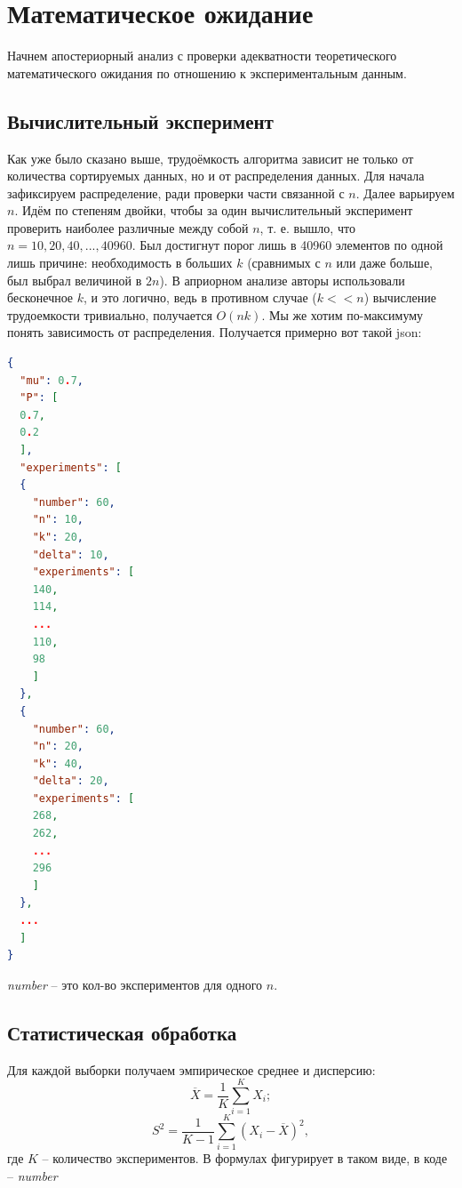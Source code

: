 \documentclass[a4paper, 12pt]{article}
\begin{document}
\newpage
\section{Математическое ожидание}
Начнем апостериорный анализ с проверки адекватности теоретического математического ожидания по отношению к экспериментальным данным.
\subsection{Вычислительный эксперимент}
Как уже было сказано выше, трудоёмкость алгоритма зависит не только от количества сортируемых данных, но и от распределения данных. Для начала зафиксируем распределение, ради проверки части связанной с $n$. Далее варьируем $n$. Идём по степеням двойки, чтобы за один вычислительный эксперимент проверить наиболее различные между собой $n$, т. е. вышло, что $n = 10, 20, 40, ..., 40960$. Был достигнут порог лишь в 40960 элементов по одной лишь причине: необходимость в больших $k$ (сравнимых с $n$ или даже больше, был выбрал величиной в $2n$). В априорном анализе авторы использовали бесконечное $k$, и это логично, ведь в противном случае ($k << n$) вычисление трудоемкости тривиально, получается $O(nk)$. Мы же хотим по-максимуму понять зависимость от распределения. Получается примерно вот такой json:
\begin{lstlisting}[language=json]
{
  "mu": 0.7,
  "P": [
  0.7,
  0.2
  ],
  "experiments": [
  {
    "number": 60,
    "n": 10,
    "k": 20,
    "delta": 10,
    "experiments": [
    140,
    114,
    ...
    110,
    98
    ]
  },
  {
    "number": 60,
    "n": 20,
    "k": 40,
    "delta": 20,
    "experiments": [
    268,
    262,
    ...
    296
    ]
  },
  ...
  ]
}
\end{lstlisting}
\textit{number} -- это кол-во экспериментов для одного $n$.
\subsection{Статистическая обработка}
Для каждой выборки получаем эмпирическое среднее и дисперсию:
\begin{equation}
	\overline{X} = \dfrac{1}{K}\sum_{i=1}^{K}X_i;
\end{equation}
\begin{equation}
	S^2 = \dfrac{1}{K-1}\sum_{i=1}^{K}(X_i-\overline{X})^2,
\end{equation}
где $K$ -- количество экспериментов. В формулах фигурирует в таком виде, в коде -- \textit{number}
\end{document}
